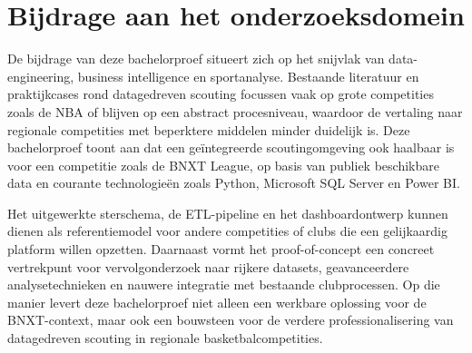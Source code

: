 \section*{Bijdrage aan het onderzoeksdomein}

De bijdrage van deze bachelorproef situeert zich op het snijvlak van data-engineering, business intelligence en sportanalyse. Bestaande literatuur en praktijkcases rond datagedreven scouting focussen vaak op grote competities zoals de NBA of blijven op een abstract procesniveau, waardoor de vertaling naar regionale competities met beperktere middelen minder duidelijk is. Deze bachelorproef toont aan dat een geïntegreerde scoutingomgeving ook haalbaar is voor een competitie zoals de BNXT League, op basis van publiek beschikbare data en courante technologieën zoals Python, Microsoft SQL Server en Power BI.

Het uitgewerkte sterschema, de ETL-pipeline en het dashboardontwerp kunnen dienen als referentiemodel voor andere competities of clubs die een gelijkaardig platform willen opzetten. Daarnaast vormt het proof-of-concept een concreet vertrekpunt voor vervolgonderzoek naar rijkere datasets, geavanceerdere analysetechnieken en nauwere integratie met bestaande clubprocessen. Op die manier levert deze bachelorproef niet alleen een werkbare oplossing voor de BNXT-context, maar ook een bouwsteen voor de verdere professionalisering van datagedreven scouting in regionale basketbalcompetities.